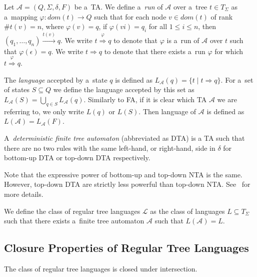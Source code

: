 Let $\mathcal{A} = (Q, \Sigma, \delta, F)$ be a~TA. We define a~\emph{run} of
$\mathcal{A}$ over a~tree $t \in T_\Sigma$ as a~mapping $\varphi: dom(t) \to Q$
such that for each node $v \in dom(t)$ of rank $\#t(v) = n$, where $\varphi(v) =
q$, if $\varphi(vi) = q_i$ for all $1 \leq i \leq n$, then $(q_1,\ldots,q_n)
\overset{t(v)}{\longrightarrow} q$. We write $t
\overset{\varphi}{\Longrightarrow} q$ to denote that $\varphi$ is a~run of
$\mathcal{A}$ over $t$ such that $\varphi(\epsilon) = q$. We write $t
\Longrightarrow q$ to denote that there exists a~run $\varphi$ for which $t
\overset{\varphi}{\Longrightarrow} q$.

The \emph{language} accepted by a~state $q$ is defined as $L_{\mathcal{A}}(q) =
\{t \mid t \Longrightarrow q\}$. For a~set of states $S \subseteq Q$ we define
the language accepted by this set as $L_{\mathcal{A}}(S) = \bigcup_{q \in S}
L_{\mathcal{A}}(q)$. Similarly to FA, if it is clear which TA $\mathcal{A}$ we
are referring to, we only write $L(q)$ or $L(S)$. Then language of $\mathcal{A}$
is defined as $L(\mathcal{A}) = L_{\mathcal{A}}(F)$.

\begin{defz}
A~\emph{deterministic finite tree automaton} (abbreviated as DTA) is a
TA such that there are no two rules with the
same left-hand, or right-hand, side in $\delta$ for bottom-up DTA or top-down
DTA respectively.
\end{defz}

Note that the expressive power of bottom-up and top-down NTA is the same.
However, top-down DTA are strictly less powerful than top-down NTA.
See~\cite{tata} for more details.

\begin{defz}
We define the class of regular tree languages $\mathcal{L}$ as the class of
languages $L \subseteq T_\Sigma$ such that there exists a~finite tree automaton
$\mathcal{A}$ such that $L(\mathcal{A}) = L$.
\end{defz}



\subsection{Closure Properties of Regular Tree Languages}\label{ta-closures}

\begin{theorem}
 The class of regular tree languages is closed under intersection.
\end{theorem}

